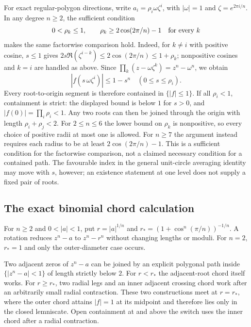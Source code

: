 For exact regular-polygon directions, write
$a_i=\rho_i\omega\zeta^i$, with $|\omega|=1$ and
$\zeta=e^{2\pi i/n}$. In any degree $n\ge2$, the sufficient condition
\[
 0<\rho_k\le1,\qquad \rho_k\ge2\cos(2\pi/n)-1\quad\hbox{for every }k
\]
makes the same factorwise comparison hold. Indeed, for $k\ne i$ with
positive cosine, $s\le1$ gives
$2s\Re(\zeta^{i-k})\le2\cos(2\pi/n)\le1+\rho_k$;
nonpositive cosines and $k=i$ are handled as above. Since
$\prod_k(z-\omega\zeta^k)=z^n-\omega^n$, we obtain
\[
 |f(s\,\omega\zeta^i)|\le1-s^n
 \quad(0\le s\le\rho_i).
\]
Every root-to-origin segment is therefore contained in $\{|f|\le1\}$.
If all $\rho_i<1$, containment is strict: the displayed bound is below
$1$ for $s>0$, and $|f(0)|=\prod_i\rho_i<1$. Any two roots can then
be joined through the origin with length $\rho_i+\rho_j<2$.
For $2\le n\le6$ the lower bound on $\rho_k$ is nonpositive,
so every choice of positive radii at most one is allowed. For $n\ge7$
the argument instead requires each radius to be at least
$2\cos(2\pi/n)-1$. This is a sufficient condition for the factorwise
comparison, not a claimed necessary condition for a contained path.
The favourable index in the general unit-circle averaging identity may
move with $s$, however; an existence statement at one level does not
supply a fixed pair of roots.

\subsection*{The exact binomial chord calculation}
\hypertarget{binomial-chord-calculation}{}
For $n\ge2$ and $0<|a|<1$, put $r=|a|^{1/n}$ and
$r_*=(1+\cos^n(\pi/n))^{-1/n}$. A rotation reduces $z^n-a$ to
$z^n-r^n$ without changing lengths or moduli. For $n=2$, $r_*=1$
and only the outer-diameter case occurs.

\begin{theorem}\label{res:complementary-binomial-chords}
Two adjacent zeros of $z^n-a$ can be joined by an explicit polygonal path
inside $\{|z^n-a|<1\}$ of length strictly below $2$.  For $r<r_*$ the
adjacent-root chord itself works.  For $r\ge r_*$, two radial legs and an
inner adjacent crossing chord work after an arbitrarily small radial
contraction.  These two constructions meet at $r=r_*$, where the outer chord attains
$|f|=1$ at its midpoint and therefore lies only in the closed lemniscate.
Open containment at and above the switch uses the inner chord
after a radial contraction.
\end{theorem}


